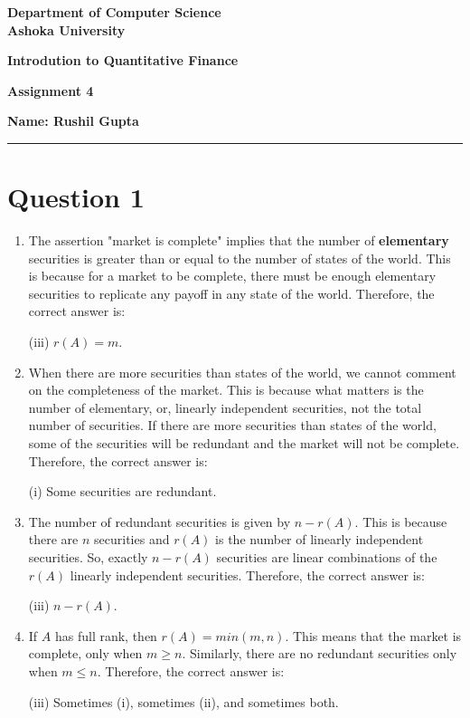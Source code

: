 \documentclass[a4paper]{article}
\begin{document}
\begin{center}
{\large \bf \color{red}  Department of Computer Science} \\
{\large \bf \color{red}  Ashoka University} \\

\vspace{0.1in}

{\large \bf \color{blue}  Introdution to Quantitative Finance}

\vspace{0.05in}

    { \bf \color{YellowOrange} Assignment 4}
\end{center}
\medskip

\hfill {\textbf{Name: Rushil Gupta} }

\bigskip
\hrule


\section*{Question 1}


\begin{enumerate}[label=(\alph*)]
    \item The assertion "market is complete" implies that the number of \textbf{elementary} securities is greater than or equal to the number of states of the world. This is because for a market to be complete, there must be enough elementary securities to replicate any payoff in any state of the world. Therefore, the correct answer is:
    
    (iii) $r(A) = m$.

    \vspace{5mm}
    \item When there are more securities than states of the world, we cannot comment on the completeness of the market. This is because what matters is the number of elementary, or, linearly independent securities, not the total number of securities. If there are more securities than states of the world, some of the securities will be redundant and the market will not be complete. Therefore, the correct answer is:
    
    (i) Some securities are redundant.

    \vspace{5mm}
    \item The number of redundant securities is given by $n - r(A)$. This is because there are $n$ securities and $r(A)$ is the number of linearly independent securities. So, exactly $n - r(A)$ securities are linear combinations of the $r(A)$ linearly independent securities. Therefore, the correct answer is:

    (iii) $n - r(A)$.

    \vspace{5mm}
    \item If $A$ has full rank, then $r(A) = min(m, n)$. This means that the market is complete, only when $m \geq n$. Similarly, there are no redundant securities only when $m \leq n$. Therefore, the correct answer is:

    (iii) Sometimes (i), sometimes (ii), and sometimes both.
\end{enumerate}
\end{document}
